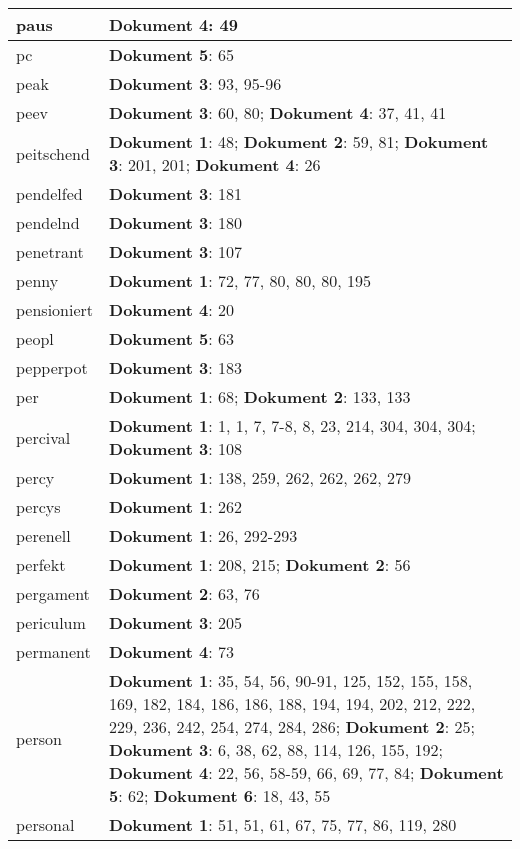 \documentclass[a5paper]{article}
\begin{document}
\begin{longtable}[l]{|l|p{3in}|}
\hline
paus & \textbf{Dokument 4}: 49 \\
\hline
pc & \textbf{Dokument 5}: 65 \\
\hline
peak & \textbf{Dokument 3}: 93, 95-96 \\
\hline
peev & \textbf{Dokument 3}: 60, 80; \textbf{Dokument 4}: 37, 41, 41 \\
\hline
peitschend & \textbf{Dokument 1}: 48; \textbf{Dokument 2}: 59, 81; \textbf{Dokument 3}: 201, 201; \textbf{Dokument 4}: 26 \\
\hline
pendelfed & \textbf{Dokument 3}: 181 \\
\hline
pendelnd & \textbf{Dokument 3}: 180 \\
\hline
penetrant & \textbf{Dokument 3}: 107 \\
\hline
penny & \textbf{Dokument 1}: 72, 77, 80, 80, 80, 195 \\
\hline
pensioniert & \textbf{Dokument 4}: 20 \\
\hline
peopl & \textbf{Dokument 5}: 63 \\
\hline
pepperpot & \textbf{Dokument 3}: 183 \\
\hline
per & \textbf{Dokument 1}: 68; \textbf{Dokument 2}: 133, 133 \\
\hline
percival & \textbf{Dokument 1}: 1, 1, 7, 7-8, 8, 23, 214, 304, 304, 304; \textbf{Dokument 3}: 108 \\
\hline
percy & \textbf{Dokument 1}: 138, 259, 262, 262, 262, 279 \\
\hline
percys & \textbf{Dokument 1}: 262 \\
\hline
perenell & \textbf{Dokument 1}: 26, 292-293 \\
\hline
perfekt & \textbf{Dokument 1}: 208, 215; \textbf{Dokument 2}: 56 \\
\hline
pergament & \textbf{Dokument 2}: 63, 76 \\
\hline
periculum & \textbf{Dokument 3}: 205 \\
\hline
permanent & \textbf{Dokument 4}: 73 \\
\hline
person & \textbf{Dokument 1}: 35, 54, 56, 90-91, 125, 152, 155, 158, 169, 182, 184, 186, 186, 188, 194, 194, 202, 212, 222, 229, 236, 242, 254, 274, 284, 286; \textbf{Dokument 2}: 25; \textbf{Dokument 3}: 6, 38, 62, 88, 114, 126, 155, 192; \textbf{Dokument 4}: 22, 56, 58-59, 66, 69, 77, 84; \textbf{Dokument 5}: 62; \textbf{Dokument 6}: 18, 43, 55 \\
\hline
personal & \textbf{Dokument 1}: 51, 51, 61, 67, 75, 77, 86, 119, 280 \\
\hline

\end{longtable}
\end{document}
